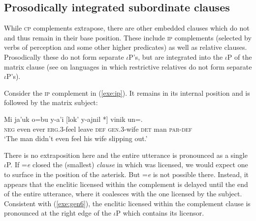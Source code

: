 \documentclass[output=paper,
modfonts
]{LSP/langsci}
\begin{document}
 \subsection{Prosodically integrated subordinate clauses}
While \textsc{cp} complements extrapose, there are other embedded clauses which do not and thus remain in their
base position. These include
\textsc{ip} complements (selected by verbs of perception and some other higher predicates) 
as well as relative clauses. Prosodically these do not form separate $\iota$P's, but are integrated into the $\iota$P 
of the matrix clause  (see \citealt{an2007} on languages in which restrictive relatives do not form separate $\iota$P's).

Consider the \textsc{ip} complement in (\ref{exe:ip}). It remains in its internal position and is followed by the matrix subject:
\begin{exe}
\ex\label{exe:ip}\bridgeoverex
\gll
 Mi ja'uk o=bu y-a'i [lok'  y-ajnil *]  vinik un=. \\
 \textsc{neg} even ever \textsc{erg.3}-feel leave \textsc{def} \textsc{gen.3}-wife {} \textsc{det} man \textsc{par-def} \\
 \glt `The man didn't even feel his wife slipping out.' \citep[49]{laughlin1977}
 \end{exe}
There is no extraposition here and the entire utterance is pronounced as a single $\iota$P. If =\emph{e} closed the (smallest) \emph{clause} in which was licensed, we would expect 
one to surface in the position of the asterisk. But =\emph{e}  is not possible there.
Instead, it appears that the enclitic licensed within the complement is delayed until the end of the entire utterance,
where it coalesces with the one licensed by the subject. Consistent with (\ref{exe:gen6}), the enclitic licensed within the complement clause is pronounced at the right edge of the $\iota$P which contains its licensor.
\end{document}
